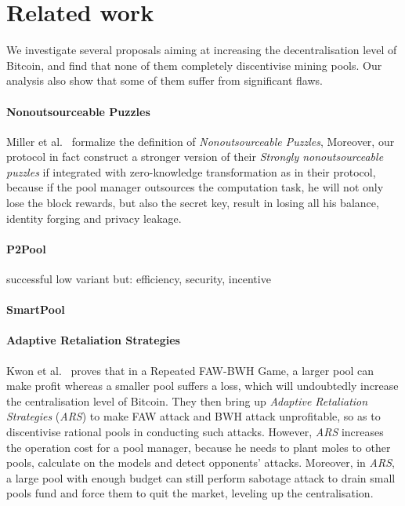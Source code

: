 \section{Related work}

We investigate several proposals aiming at increasing the decentralisation level of Bitcoin, and find that none of them completely discentivise mining pools.
Our analysis also show that some of them suffer from significant flaws.

\paragraph{\textbf{Nonoutsourceable Puzzles}}
Miller et al.~\cite{miller2015nonoutsourceable} formalize the definition of \textit{Nonoutsourceable Puzzles},
Moreover, our protocol in fact construct a stronger version of their \textit{Strongly nonoutsourceable puzzles} if integrated with zero-knowledge transformation as in their protocol, because if the pool manager outsources the computation task, he will not only lose the block rewards, but also the secret key, result in losing all his balance, identity forging and privacy leakage.

\paragraph{\textbf{P2Pool}}
successful
low variant
but: efficiency, security, incentive



\paragraph{\textbf{SmartPool}}

\paragraph{\textbf{Adaptive Retaliation Strategies}}
Kwon et al.~\cite{kwon2019eye} proves that in a Repeated FAW\cite{courtois2014subversive,rosenfeld2011analysis}-BWH\cite{kwon2017selfish} Game, a larger pool can make profit whereas a smaller pool suffers a loss, which will undoubtedly increase the centralisation level of Bitcoin.
They then bring up \textit{Adaptive Retaliation Strategies} (\textit{ARS}) to make FAW attack and BWH attack unprofitable, so as to discentivise rational pools in conducting such attacks.
However, \textit{ARS} increases the operation cost for a pool manager, because he needs to plant moles to other pools, calculate on the models and detect opponents' attacks.
Moreover, in \textit{ARS}, a large pool with enough budget can still perform sabotage attack to drain small pools fund and force them to quit the market, leveling up the centralisation.

